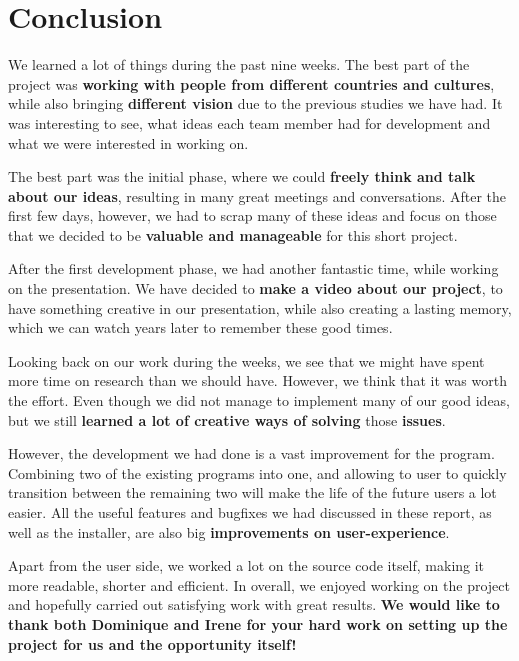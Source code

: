 \documentclass[a4paper, 11pt, article]{report}
\begin{document}
\chapter{Conclusion}

We learned a lot of things during the past nine weeks. The best part of the project was \textbf{working with people from different countries and cultures}, while also bringing \textbf{different vision} due to the previous studies we have had. It was interesting to see, what ideas each team member had for development and what we were interested in working on.

The best part was the initial phase, where we could \textbf{freely think and talk about our ideas}, resulting in many great meetings and conversations. After the first few days, however, we had to scrap many of these ideas and focus on those that we decided to be \textbf{valuable and manageable} for this short project.

After the first development phase, we had another fantastic time, while working on the presentation. We have decided to \textbf{make a video about our project}, to have something creative in our presentation, while also creating a lasting memory, which we can watch years later to remember these good times.

Looking back on our work during the weeks, we see that we might have spent more time on research than we should have. However, we think that it was worth the effort. Even though we did not manage to implement many of our good ideas, but we still \textbf{learned a lot of creative ways of solving} those \textbf{issues}.

However, the development we had done is a vast improvement for the program. Combining two of the existing programs into one, and allowing to user to quickly transition between the remaining two will make the life of the future users a lot easier. All the useful features and bugfixes we had discussed in these report, as well as the installer, are also big \textbf{improvements on user-experience}.

Apart from the user side, we worked a lot on the source code itself, making it more readable, shorter and efficient. In overall, we enjoyed working on the project and hopefully carried out satisfying work with great results. \textbf{We would like to thank both Dominique and Irene for your hard work on setting up the project for us and the opportunity itself!}

\end{document}
